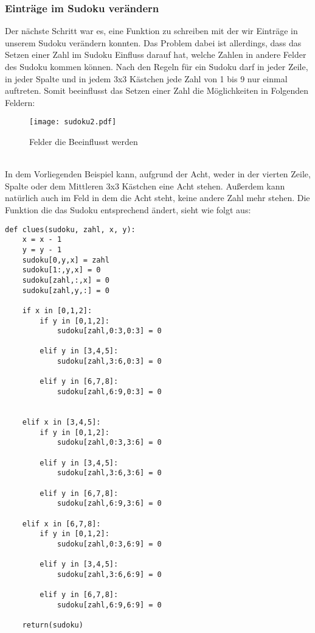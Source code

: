 \documentclass[11pt,a4paper]{article}
\begin{document}
\subsubsection{Einträge im Sudoku verändern}
Der nächste Schritt war es, eine Funktion zu schreiben mit der wir Einträge in unserem Sudoku verändern konnten. Das Problem dabei ist allerdings, dass das Setzen einer Zahl im Sudoku Einfluss darauf hat, welche Zahlen in andere Felder des Sudoku kommen können. Nach den Regeln für ein Sudoku darf in jeder Zeile, in jeder Spalte und in jedem 3x3 Kästchen jede Zahl von 1 bis 9 nur einmal auftreten. Somit beeinflusst das Setzen einer Zahl die Möglichkeiten in Folgenden Feldern:
\ \\
\begin{figure}[htbp!]
\begin{center}
\texttt{[image: sudoku2.pdf]}
\end{center}
\caption{Felder die Beeinflusst werden}
\end{figure}
\ \\ 
In dem Vorliegenden Beispiel kann, aufgrund der Acht, weder in der vierten Zeile, Spalte oder dem Mittleren 3x3 Kästchen eine Acht stehen. Außerdem kann natürlich auch im Feld in dem die Acht steht, keine andere Zahl mehr stehen. Die Funktion die das Sudoku entsprechend ändert, sieht wie folgt aus:
\ \\
\begin{verbatim}
def clues(sudoku, zahl, x, y):
    x = x - 1                       
    y = y - 1                        
    sudoku[0,y,x] = zahl             
    sudoku[1:,y,x] = 0               
    sudoku[zahl,:,x] = 0             
    sudoku[zahl,y,:] = 0             
    
    if x in [0,1,2]:                 
        if y in [0,1,2]:             
            sudoku[zahl,0:3,0:3] = 0 
        
        elif y in [3,4,5]:
            sudoku[zahl,3:6,0:3] = 0
        
        elif y in [6,7,8]:
            sudoku[zahl,6:9,0:3] = 0
        
    
    elif x in [3,4,5]:
        if y in [0,1,2]:
            sudoku[zahl,0:3,3:6] = 0
        
        elif y in [3,4,5]:
            sudoku[zahl,3:6,3:6] = 0
        
        elif y in [6,7,8]:
            sudoku[zahl,6:9,3:6] = 0
    
    elif x in [6,7,8]:
        if y in [0,1,2]:
            sudoku[zahl,0:3,6:9] = 0
        
        elif y in [3,4,5]:
            sudoku[zahl,3:6,6:9] = 0
        
        elif y in [6,7,8]:
            sudoku[zahl,6:9,6:9] = 0
    
    return(sudoku)
\end{verbatim}
\end{document}
